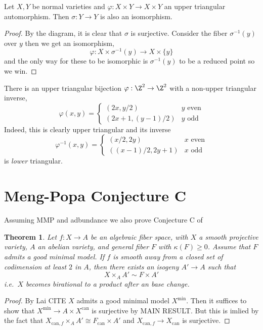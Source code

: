 \documentclass[12pt]{article}
\theoremstyle{plain}
\newtheorem{Lthm}{Theorem}
\begin{document}
\begin{lemma}
Let $X,Y$ be normal varieties and $\varphi : X \times Y \to X \times Y$ an upper triangular automorphism. Then $\sigma : Y \to Y$ is also an isomorphism. 
\end{lemma}

\begin{proof}
By the diagram, it is clear that $\sigma$ is surjective. Consider the fiber $\sigma^{-1}(y)$ over $y$ then we get an isomorphism,
\[ \varphi : X \times \sigma^{-1}(y) \to X \times \{ y \} \]
and the only way for these to be isomorphic is $\sigma^{-1}(y)$ to be a reduced point so we win.
\end{proof}

\begin{example}
There is an upper triangular bijection $\varphi : \Z^2 \to \Z^2$ with a non-upper triangular inverse,
\[ \varphi(x,y) = 
\begin{cases}
(2x, y/2) & y \text{ even}
\\
(2x + 1, (y-1)/2) & y \text{ odd}
\end{cases} \]
Indeed, this is clearly upper triangular and its inverse 
\[ \varphi^{-1}(x,y) = 
\begin{cases}
(x/2, 2y) & x \text{ even}
\\
((x-1)/2, 2y + 1) & x \text{ odd}
\end{cases} \]
is \textit{lower} triangular. 
\end{example}

\section{Meng-Popa Conjecture C}

Assuming MMP and adbundance we also prove Conjecture C of \cite{MP21}

\begin{Lthm}
Let $f : X \to A$ be an algebraic fiber space, with $X$ a smooth projective variety, $A$ an abelian variety, and general fiber $F$ with $\kappa(F) \ge 0$. Assume that $F$ admits a good minimal model. If $f$ is smooth away from a closed set of codimension at least $2$ in $A$, then there exists an isogeny $A' \to A$ such that
\[ X \times_A A' \sim F \times A' \]
i.e.\ $X$ becomes birational to a product after an \etale base change.
\end{Lthm}

\newcommand{\can}{\mathrm{can}}

\begin{proof}
By Lai {\color{red} CITE} $X$ admits a good minimal model $X^{\min}$. Then it suffices to show that $X^{\min} \to A \times X^{\can}$ is surjective by {\color{red} MAIN RESULT}. But this is imlied by the fact that $X_{\can, f} \times_A A' \cong F_{\can} \times A'$ and $X_{\can, f} \to X_{\can}$ is surjective.  
\end{proof}
\end{document}

